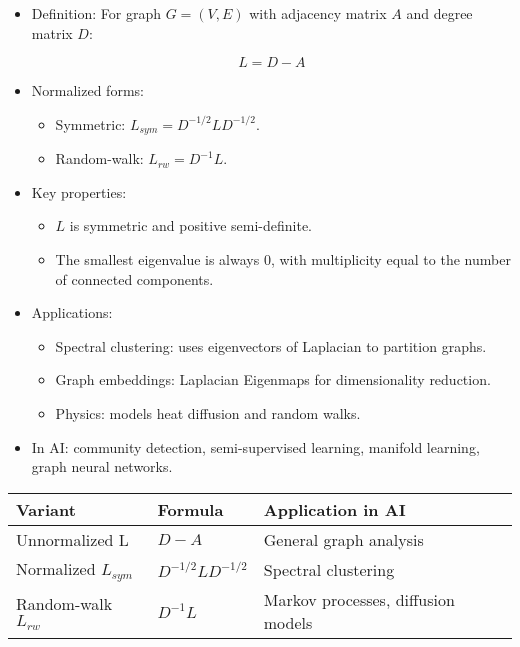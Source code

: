 \documentclass[
  letterpaper,
  DIV=11,
  numbers=noendperiod]{scrreprt}
\providecommand{\tightlist}{%
  \setlength{\itemsep}{0pt}\setlength{\parskip}{0pt}}
\begin{document}
\begin{itemize}
\item
  Definition: For graph \(G=(V,E)\) with adjacency matrix \(A\) and
  degree matrix \(D\):

  \[
  L = D - A
  \]
\item
  Normalized forms:

  \begin{itemize}
  \tightlist
  \item
    Symmetric: \(L_{sym} = D^{-1/2} L D^{-1/2}\).
  \item
    Random-walk: \(L_{rw} = D^{-1} L\).
  \end{itemize}
\item
  Key properties:

  \begin{itemize}
  \tightlist
  \item
    \(L\) is symmetric and positive semi-definite.
  \item
    The smallest eigenvalue is always 0, with multiplicity equal to the
    number of connected components.
  \end{itemize}
\item
  Applications:

  \begin{itemize}
  \tightlist
  \item
    Spectral clustering: uses eigenvectors of Laplacian to partition
    graphs.
  \item
    Graph embeddings: Laplacian Eigenmaps for dimensionality reduction.
  \item
    Physics: models heat diffusion and random walks.
  \end{itemize}
\item
  In AI: community detection, semi-supervised learning, manifold
  learning, graph neural networks.
\end{itemize}

\begin{longtable}[]{@{}
  >{\raggedright\arraybackslash}p{}
  >{\raggedright\arraybackslash}p{}
  >{\raggedright\arraybackslash}p{}@{}}
\toprule\noalign{}
\begin{minipage}[b]{\linewidth}\raggedright
Variant
\end{minipage} & \begin{minipage}[b]{\linewidth}\raggedright
Formula
\end{minipage} & \begin{minipage}[b]{\linewidth}\raggedright
Application in AI
\end{minipage} \\
\midrule\noalign{}
\endhead
\bottomrule\noalign{}
\endlastfoot
Unnormalized L & \(D - A\) & General graph analysis \\
Normalized \(L_{sym}\) & \(D^{-1/2}LD^{-1/2}\) & Spectral clustering \\
Random-walk \(L_{rw}\) & \(D^{-1}L\) & Markov processes, diffusion
models \\
\end{longtable}
\end{document}

